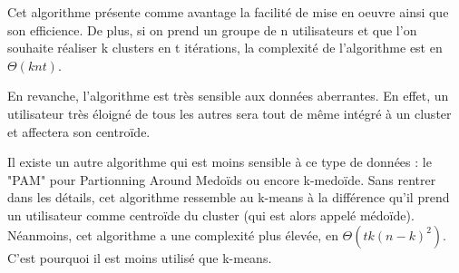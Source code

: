 Cet algorithme présente comme avantage la facilité de mise en oeuvre ainsi que son efficience. De plus, si on prend un groupe de n utilisateurs et que l'on souhaite réaliser k clusters en t itérations, la complexité de l'algorithme est en $\Theta(knt)$.\par
En revanche, l'algorithme est très sensible aux données aberrantes. En effet, un utilisateur très éloigné de tous les autres sera tout de même intégré à un cluster et affectera son centroïde.\par
Il existe un autre algorithme qui est moins sensible à ce type de données : le "PAM" pour Partionning Around Medoïds ou encore k-medoïde. Sans rentrer dans les détails, cet algorithme ressemble au k-means à la différence qu'il prend un utilisateur comme centroïde du cluster (qui est alors appelé médoïde).
Néanmoins, cet algorithme a une complexité plus élevée, en $\Theta(tk(n-k)^2)$. C'est pourquoi il est moins utilisé que k-means.
